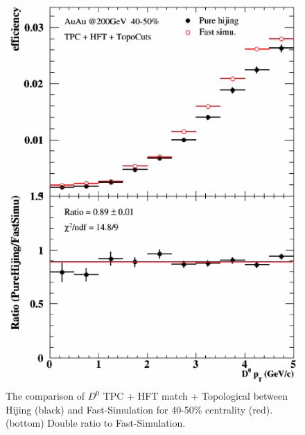 \begin{figure}[htbp]
\begin{minipage}[htbp]{0.47\linewidth}
\includegraphics[width=1.0\textwidth,angle=0]{figure/Run14_D0HFT/40_50.png} 
\caption{ The comparison of $D^0$ TPC + HFT match + Topological between Hijing (black) and Fast-Simulation for 40-50\% centrality (red). (bottom) Double ratio to Fast-Simulation.\label{40_50}}
\end{minipage}
\end{figure}

